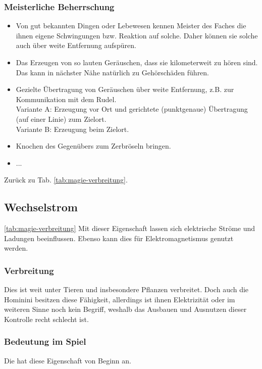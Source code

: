 \subsubsection{Meisterliche Beherrschung} 
\begin{itemize}
	\item Von gut bekannten Dingen oder Lebewesen kennen Meister des Faches die ihnen eigene Schwingungen bzw. Reaktion auf solche. 
	Daher können sie solche auch über weite Entfernung aufspüren.
	\item Das Erzeugen von so lauten Geräuschen, dass sie kilometerweit zu hören sind. 
	Das kann in nächster Nähe natürlich zu Gehörschäden führen.
	\item Gezielte Übertragung von Geräuschen über weite Entfernung, z.B. zur Kommunikation mit dem Rudel. \\ 
	Variante A: Erzeugung vor Ort und gerichtete (punktgenaue) Übertragung (auf einer Linie) zum Zielort. \\
	Variante B: Erzeugung beim Zielort.
	\item Knochen des Gegenübers zum Zerbröseln bringen.
	\item ...
\end{itemize}
Zurück zu Tab. \ref{tab:magie-verbreitung}.



\subsection{Wechselstrom}\label{sec:wechselstrommagie} \ref{tab:magie-verbreitung} %
Mit dieser Eigenschaft lassen sich elektrische Ströme und Ladungen beeinflussen. Ebenso kann dies für Elektromagnetismus genutzt werden.

\subsubsection{Verbreitung}
Dies ist weit unter Tieren und insbesondere Pflanzen verbreitet. Doch auch die Hominini besitzen diese Fähigkeit, allerdings ist ihnen Elektrizität oder im weiteren Sinne noch kein Begriff, weshalb das Ausbauen und Ausnutzen dieser Kontrolle recht schlecht ist.

\subsubsection{Bedeutung im Spiel}
Die  hat diese Eigenschaft von Beginn an. 

